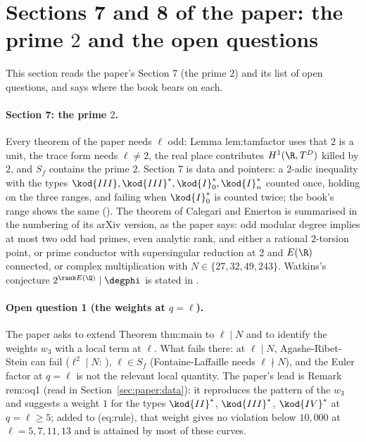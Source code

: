 \begin{sloppypar}
\section[Paper 7, 8: the prime 2, open questions]{Sections 7 and 8 of the paper: the prime $2$ and the open questions}\label{sec:paper:two-open}

This section reads the paper's Section 7 (the prime $2$) and its list of open questions, and says where the book bears on each.

\paragraph{Section 7: the prime $2$.} Every theorem of the paper needs $\ell$ odd: Lemma lem:tamfactor uses that $2$ is a unit, the trace form needs $\ell\ne2$, the real place contributes
$H^1(\R,T^D)$ killed by $2$, and $S_f$ contains the prime $2$. Section 7 is data and pointers: a $2$-adic inequality with the types $\kod{III},\kod{III}^*,\kod{I}_0^*,\kod{I}_n^*$ counted once, holding on
the three ranges, and failing when $\kod{I}_0^*$ is counted twice; the book's range shows the same (). The theorem of Calegari and Emerton \cite{CalegariEmerton09} is
summarised in the numbering of its arXiv version, as the paper says: odd modular degree implies at most two odd bad primes, even analytic rank, and either a rational
$2$-torsion point, or prime conductor with supersingular reduction at $2$ and $E(\R)$ connected, or complex multiplication with $N\in\{27,32,49,243\}$. Watkins's conjecture
$2^{\rank E(\Q)}\mid\degphi$ is stated in .

\paragraph{Open question 1 (the weights at $q=\ell$).} The paper asks to extend Theorem thm:main to $\ell\mid N$ and to identify the weights $w_3$ with a local term at $\ell$. What fails
there: at $\ell\mid N$, Agashe-Ribet-Stein can fail ($\ell^2\mid N$: ), $\ell\in S_f$ (Fontaine-Laffaille needs $\ell\nmid N$), and the Euler factor at $q=\ell$ is not the relevant
local quantity. The paper's lead is Remark rem:oq1 (read in Section~\ref{sec:paper:data}): it reproduces the pattern of the $w_3$ and suggests a weight $1$ for the types $\kod{II}^*$,
$\kod{III}^*$, $\kod{IV}^*$ at $q=\ell\ge5$; added to (eq:rule), that weight gives no violation below $10{,}000$ at $\ell=5,7,11,13$ and is attained by most of these curves.


\end{sloppypar}
